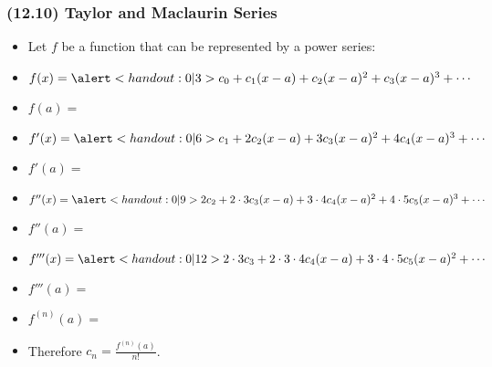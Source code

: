 \begin{frame}
\frametitle{(12.10)  Taylor and Maclaurin Series}
\begin{itemize}
\item  Let $f$ be a function that can be represented by a power series: 
\item  $f(x) = \alert<handout:0| 3>{c_0} + c_1 (x-a) + c_2 (x-a)^2 + c_3(x-a)^3 + \cdots$
\item<2-| alert@2-3>  $f(a) = $ 
\item<4->  $f'(x) = \alert<handout:0| 6>{c_1}  + 2c_2 (x-a) + 3c_3(x-a)^2 + 4c_4 (x-a)^3 + \cdots$
\item<5-| alert@5-6>  $f'(a) = $ 
\item<7->  $f''(x) =  \alert<handout:0| 9>{2c_2}  + 2\cdot 3c_3(x-a) + 3\cdot 4c_4 (x-a)^2 + 4\cdot 5 c_5 (x-a)^3 + \cdots$
\item<8-| alert@8-9>  $f''(a) = $ 
\item<10->  $f'''(x) =   \alert<handout:0| 12>{2\cdot 3c_3} + 2\cdot 3\cdot 4c_4 (x-a) + 3\cdot 4\cdot 5  c_5(x-a)^2 + \cdots$
\item<11-| alert@11-12>  $f'''(a) = $ 
\item<13-| alert@13-14>  $f^{(n)}(a) = $ 
\item<15->  Therefore $c_n = \frac{f^{(n)}(a)}{n!}$.
\end{itemize}
\end{frame}
